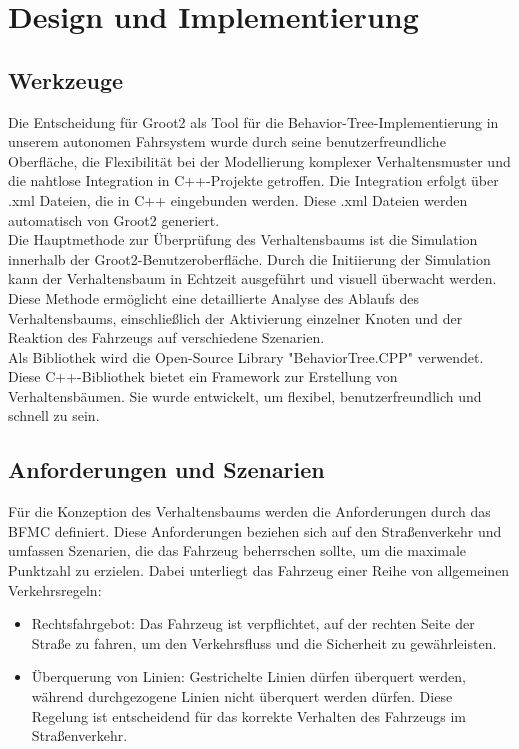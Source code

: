 \section{Design und Implementierung}


\subsection{Werkzeuge}

Die Entscheidung für Groot2 als Tool für die Behavior-Tree-Implementierung in unserem autonomen Fahrsystem wurde durch seine benutzerfreundliche Oberfläche, die Flexibilität bei der Modellierung komplexer Verhaltensmuster und die nahtlose Integration in C++-Projekte getroffen. Die Integration erfolgt über .xml Dateien, die in C++ eingebunden werden. Diese .xml Dateien werden automatisch von Groot2 generiert.\\

Die Hauptmethode zur Überprüfung des Verhaltensbaums ist die Simulation innerhalb der Groot2-Benutzeroberfläche. Durch die Initiierung der Simulation kann der Verhaltensbaum in Echtzeit ausgeführt und visuell überwacht werden. Diese Methode ermöglicht eine detaillierte Analyse des Ablaufs des Verhaltensbaums, einschließlich der Aktivierung einzelner Knoten und der Reaktion des Fahrzeugs auf verschiedene Szenarien.\\

Als Bibliothek wird die Open-Source Library "BehaviorTree.CPP" verwendet. Diese C++-Bibliothek bietet ein Framework zur Erstellung von Verhaltensbäumen. Sie wurde entwickelt, um flexibel, benutzerfreundlich und schnell zu sein.\cite{bt-cpp}

\newpage
\subsection{Anforderungen und Szenarien}

Für die Konzeption des Verhaltensbaums werden die Anforderungen durch das BFMC definiert. Diese Anforderungen beziehen sich auf den Straßenverkehr und umfassen Szenarien, die das Fahrzeug beherrschen sollte, um die maximale Punktzahl zu erzielen. Dabei unterliegt das Fahrzeug einer Reihe von allgemeinen Verkehrsregeln:

\begin{itemize}
    \item Rechtsfahrgebot: Das Fahrzeug ist verpflichtet, auf der rechten Seite der Straße zu fahren, um den Verkehrsfluss und die Sicherheit zu gewährleisten.
    \item Überquerung von Linien: Gestrichelte Linien dürfen überquert werden, während durchgezogene Linien nicht überquert werden dürfen. Diese Regelung ist entscheidend für das korrekte Verhalten des Fahrzeugs im Straßenverkehr.
\end{itemize}

